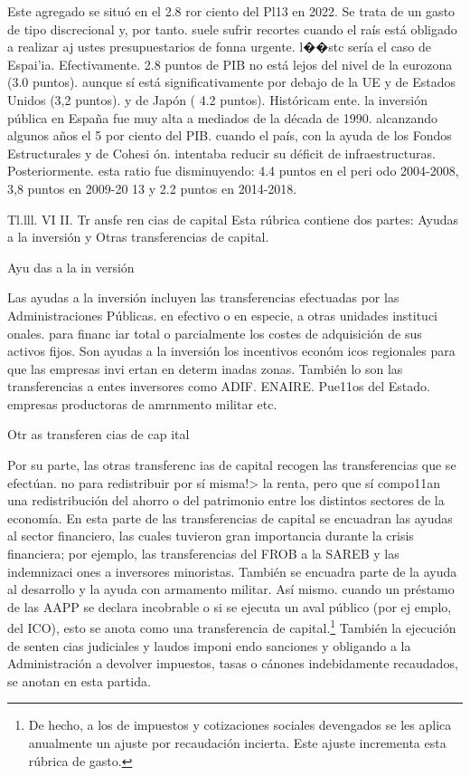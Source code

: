 \documentclass[10pt,a4paper]{article}
\begin{document}
Este agregado se situó en el 2.8 ror ciento del Pl13 en 2022. Se trata de un gasto de tipo discrecional y, por tanto. suele sufrir recortes cuando el raís está obligado a realizar aj ustes presupuestarios de fonna urgente. l��stc sería el caso de Espai'ia. Efectivamente. 2.8 puntos de PIB no está lejos del nivel de la eurozona (3.0 puntos). aunque sí está significativamente por debajo de la UE y de Estados Unidos (3,2 puntos). y de Japón ( 4.2 puntos). Históricam ente. la inversión pública en España fue muy alta a mediados de la década de 1990. alcanzando algunos años el 5 por ciento del PIB. cuando el país, con la ayuda de los Fondos Estructurales y de Cohesi ón. intentaba reducir su déficit de infraestructuras. Posteriormente. esta ratio fue disminuyendo: 4.4 puntos en el peri odo 2004-2008, 3,8 puntos en 2009-20 13 y 2.2 puntos en 2014-2018.

Tl.lll. VI II. Tr ansfe ren cias de capital
Esta rúbrica contiene dos partes: Ayudas a la inversión y Otras transferencias de capital.

Ayu das a la in versión

Las ayudas a la inversión incluyen las transferencias efectuadas por las Administraciones Públicas. en efectivo o en especie, a otras unidades instituci onales. para financ iar total o parcialmente los costes de adquisición de sus activos fijos. Son ayudas a la inversión los incentivos económ icos regionales para que las empresas invi ertan en determ inadas zonas. También lo son las transferencias a entes inversores como ADIF. ENAIRE. Pue11os del Estado. empresas productoras de amrnmento militar etc.

Otr as transferen cias de cap ital

Por su parte, las otras transferenc ias de capital recogen las transferencias que se efectúan. no para redistribuir por sí misma!> la renta, pero que sí compo11an una redistribución del ahorro o del patrimonio entre los distintos sectores de la economía. En esta parte de las transferencias de capital se encuadran las ayudas al sector financiero, las cuales tuvieron gran importancia durante la crisis financiera; por ejemplo, las transferencias del FROB a la SAREB y las indemnizaci ones a inversores minoristas. También se encuadra parte de la ayuda al desarrollo y la ayuda con armamento militar. Así mismo. cuando un préstamo de las AAPP se declara incobrable o si se ejecuta un aval público (por ej emplo, del ICO), esto se anota como una transferencia de capital.\footnote{%
    De hecho, a los de impuestos y cotizaciones sociales devengados se les aplica anualmente un ajuste por recaudación incierta. Este ajuste incrementa esta rúbrica de gasto.
} También la ejecución de senten cias judiciales y laudos imponi endo sanciones y obligando a la Administración a devolver impuestos, tasas o cánones indebidamente recaudados, se anotan en esta partida.
\end{document}
